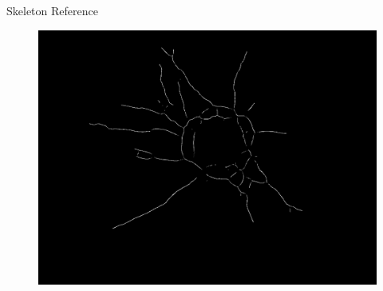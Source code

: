 \documentclass{beamer}
\begin{document}
\begin{frame}{Skeleton Reference}
	\begin{figure}
		\centering
		\includegraphics[width=\textwidth]{images/mono_skeletonized}
	\end{figure}
\end{frame}
\end{document}
